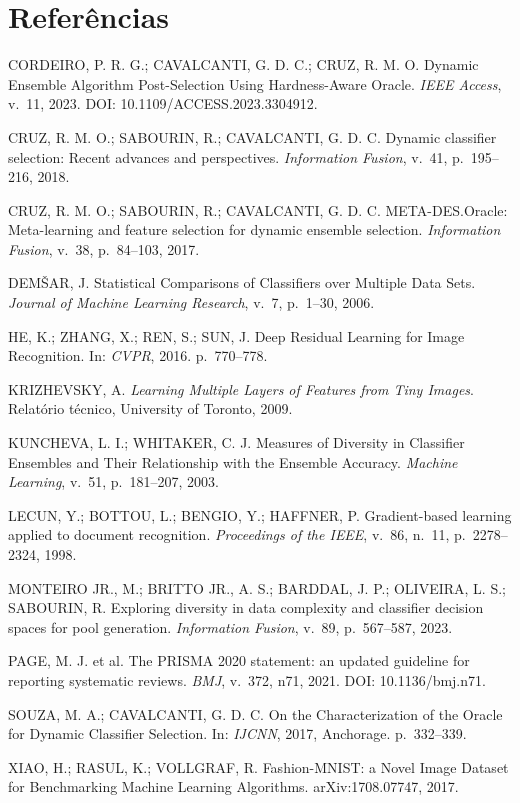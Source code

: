 \section*{Referências}

\begin{description}
\item CORDEIRO, P. R. G.; CAVALCANTI, G. D. C.; CRUZ, R. M. O. Dynamic Ensemble
Algorithm Post-Selection Using Hardness-Aware Oracle. \emph{IEEE Access}, v.\ 11,
2023. DOI: 10.1109/ACCESS.2023.3304912.

\item CRUZ, R. M. O.; SABOURIN, R.; CAVALCANTI, G. D. C. Dynamic classifier
selection: Recent advances and perspectives. \emph{Information Fusion}, v.\ 41,
p.\ 195--216, 2018.

\item CRUZ, R. M. O.; SABOURIN, R.; CAVALCANTI, G. D. C. META-DES.Oracle:
Meta-learning and feature selection for dynamic ensemble selection.
\emph{Information Fusion}, v.\ 38, p.\ 84--103, 2017.

\item DEM\v{S}AR, J. Statistical Comparisons of Classifiers over Multiple Data Sets.
\emph{Journal of Machine Learning Research}, v.\ 7, p.\ 1--30, 2006.

\item HE, K.; ZHANG, X.; REN, S.; SUN, J. Deep Residual Learning for Image
Recognition. In: \emph{CVPR}, 2016. p.\ 770--778.

\item KRIZHEVSKY, A. \emph{Learning Multiple Layers of Features from Tiny Images}.
Relatório técnico, University of Toronto, 2009.

\item KUNCHEVA, L. I.; WHITAKER, C. J. Measures of Diversity in Classifier Ensembles
and Their Relationship with the Ensemble Accuracy. \emph{Machine Learning}, v.\ 51,
p.\ 181--207, 2003.

\item LECUN, Y.; BOTTOU, L.; BENGIO, Y.; HAFFNER, P. Gradient-based learning
applied to document recognition. \emph{Proceedings of the IEEE}, v.\ 86, n.\ 11,
p.\ 2278--2324, 1998.

\item MONTEIRO JR., M.; BRITTO JR., A. S.; BARDDAL, J. P.; OLIVEIRA, L. S.;
SABOURIN, R. Exploring diversity in data complexity and classifier decision spaces
for pool generation. \emph{Information Fusion}, v.\ 89, p.\ 567--587, 2023.

\item PAGE, M. J. et al. The PRISMA 2020 statement: an updated guideline for
reporting systematic reviews. \emph{BMJ}, v.\ 372, n71, 2021.
DOI: 10.1136/bmj.n71.

\item SOUZA, M. A.; CAVALCANTI, G. D. C. On the Characterization of the Oracle for
Dynamic Classifier Selection. In: \emph{IJCNN}, 2017, Anchorage. p.\ 332--339.

\item XIAO, H.; RASUL, K.; VOLLGRAF, R. Fashion-MNIST: a Novel Image Dataset for
Benchmarking Machine Learning Algorithms. arXiv:1708.07747, 2017.
\end{description}
